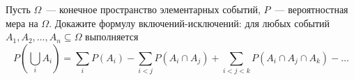 Пусть $\Omega$~--- конечное пространство элементарных событий, $P$~--- вероятностная мера на $\Omega$. Докажите формулу
включений-исключений: для любых событий $A_1, A_2, \dots, A_n \subseteq \Omega$ выполняется
$$P(\bigcup\limits_i A_i) = \sum\limits_{i} P(A_i) - \sum\limits_{i < j} P(A_i \cap A_j) + \sum\limits_{i < j < k} P(A_i \cap
A_j \cap A_k) - \dots$$ 
